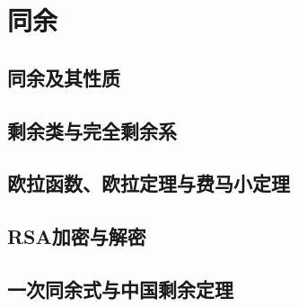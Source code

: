 
\section{同余}
\label{sec:congruences}

\subsection{同余及其性质}
\label{sec:congruences-and-its-properties}

\subsection{剩余类与完全剩余系}
\label{sec:residue-and-complete-set-of-residues}

\subsection{欧拉函数、欧拉定理与费马小定理}
\label{sec:euler-function-and-euler-theorem-and-fermat-small-theorem}

\subsection{RSA加密与解密}
\label{sec:rsa-encrypt-decrypt}

\subsection{一次同余式与中国剩余定理}
\label{sec:congruence-of-first-degree-and-chinese-remainder-theorem}


